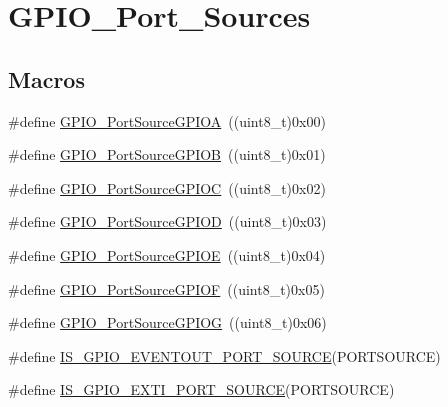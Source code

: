 \hypertarget{group___g_p_i_o___port___sources}{}\section{G\+P\+I\+O\+\_\+\+Port\+\_\+\+Sources}
\label{group___g_p_i_o___port___sources}
\subsection*{Macros}
\begin{DoxyCompactItemize}
\item 
\#define \mbox{\hyperlink{group___g_p_i_o___port___sources_gacddaa6b6535b5de02ba99e75111c4924}{G\+P\+I\+O\+\_\+\+Port\+Source\+G\+P\+I\+OA}}~((uint8\+\_\+t)0x00)
\item 
\#define \mbox{\hyperlink{group___g_p_i_o___port___sources_ga20a7ea6589564aee1fd5344bf01e65e5}{G\+P\+I\+O\+\_\+\+Port\+Source\+G\+P\+I\+OB}}~((uint8\+\_\+t)0x01)
\item 
\#define \mbox{\hyperlink{group___g_p_i_o___port___sources_ga7511e96933d503ecf7128ebaff613e7e}{G\+P\+I\+O\+\_\+\+Port\+Source\+G\+P\+I\+OC}}~((uint8\+\_\+t)0x02)
\item 
\#define \mbox{\hyperlink{group___g_p_i_o___port___sources_ga68309c29660ae328d3699781520e3d21}{G\+P\+I\+O\+\_\+\+Port\+Source\+G\+P\+I\+OD}}~((uint8\+\_\+t)0x03)
\item 
\#define \mbox{\hyperlink{group___g_p_i_o___port___sources_ga8b849f35292768d73a9f9a76cac96456}{G\+P\+I\+O\+\_\+\+Port\+Source\+G\+P\+I\+OE}}~((uint8\+\_\+t)0x04)
\item 
\#define \mbox{\hyperlink{group___g_p_i_o___port___sources_ga19dfaf7ac2cdf66b697bcd8665b860ef}{G\+P\+I\+O\+\_\+\+Port\+Source\+G\+P\+I\+OF}}~((uint8\+\_\+t)0x05)
\item 
\#define \mbox{\hyperlink{group___g_p_i_o___port___sources_ga43af0aa9b42aefa2c7d24dfa9889040b}{G\+P\+I\+O\+\_\+\+Port\+Source\+G\+P\+I\+OG}}~((uint8\+\_\+t)0x06)
\item 
\#define \mbox{\hyperlink{group___g_p_i_o___port___sources_ga40d86e5f9f013777038932f57bc6bbef}{I\+S\+\_\+\+G\+P\+I\+O\+\_\+\+E\+V\+E\+N\+T\+O\+U\+T\+\_\+\+P\+O\+R\+T\+\_\+\+S\+O\+U\+R\+CE}}(P\+O\+R\+T\+S\+O\+U\+R\+CE)
\item 
\#define \mbox{\hyperlink{group___g_p_i_o___port___sources_ga53c3a469f6b286da38bc198acf25e8f1}{I\+S\+\_\+\+G\+P\+I\+O\+\_\+\+E\+X\+T\+I\+\_\+\+P\+O\+R\+T\+\_\+\+S\+O\+U\+R\+CE}}(P\+O\+R\+T\+S\+O\+U\+R\+CE)
\end{DoxyCompactItemize}


